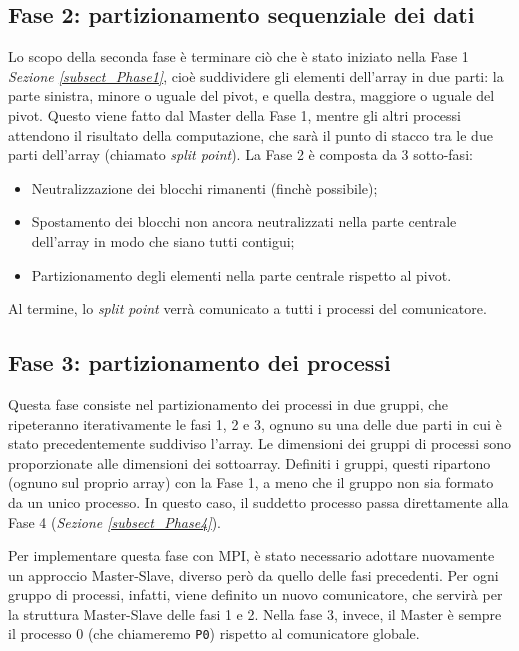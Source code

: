 \subsection{Fase 2: partizionamento sequenziale dei dati} \label{subsect_Phase2}
Lo scopo della seconda fase è terminare ciò che è stato iniziato nella Fase 1 \textit{Sezione \ref{subsect_Phase1}}, cioè suddividere gli elementi dell'array in due parti: la parte sinistra, minore o uguale del pivot, e quella destra, maggiore o uguale del pivot. Questo viene fatto dal Master della Fase 1, mentre gli altri processi attendono il risultato della computazione, che sarà il punto di stacco tra le due parti dell'array (chiamato \textit{split point}).
La Fase 2 è composta da 3 sotto-fasi:
\begin{itemize}
\item Neutralizzazione dei blocchi rimanenti (finchè possibile);
\item Spostamento dei blocchi non ancora neutralizzati nella parte centrale dell'array in modo che siano tutti contigui;
\item Partizionamento degli elementi nella parte centrale rispetto al pivot.
\end{itemize}
Al termine, lo \textit{split point} verrà comunicato a tutti i processi del comunicatore.


\subsection{Fase 3: partizionamento dei processi} \label{subsect_Phase3}
Questa fase consiste nel partizionamento dei processi in due gruppi, che ripeteranno iterativamente le fasi 1, 2 e 3, ognuno su una delle due parti in cui è stato precedentemente suddiviso l'array. Le dimensioni dei gruppi di processi sono proporzionate alle dimensioni dei sottoarray.
Definiti i gruppi, questi ripartono (ognuno sul proprio array) con la Fase 1, a meno che il gruppo non sia formato da un unico processo. In questo caso, il suddetto processo passa direttamente alla Fase 4 (\textit{Sezione \ref{subsect_Phase4}}).

Per implementare questa fase con MPI, è stato necessario adottare nuovamente un approccio Master-Slave, diverso però da quello delle fasi precedenti. Per ogni gruppo di processi, infatti, viene definito un nuovo comunicatore, che servirà per la struttura Master-Slave delle fasi 1 e 2. Nella fase 3, invece, il Master è sempre il processo 0 (che chiameremo \texttt{P0}) rispetto al comunicatore globale.


